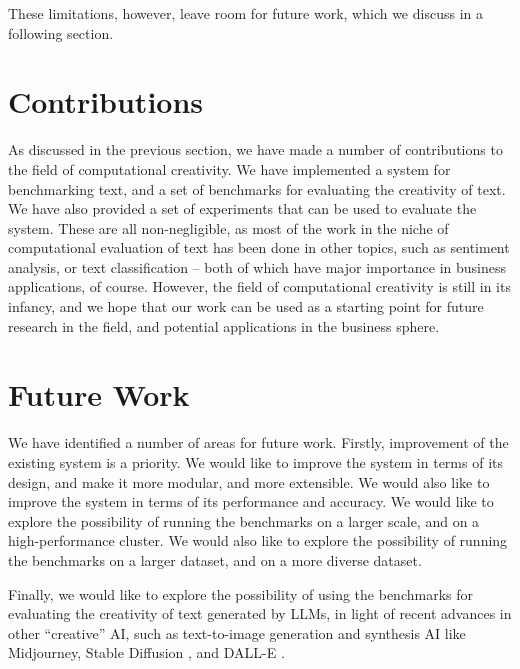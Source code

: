 These limitations, however, leave room for future work, which we discuss in a following section.

\section{Contributions}

As discussed in the previous section, we have made a number of contributions to the field of computational creativity. We have implemented a system for benchmarking text, and a set of benchmarks for evaluating the creativity of text. We have also provided a set of experiments that can be used to evaluate the system. These are all non-negligible, as most of the work in the niche of computational evaluation of text has been done in other topics, such as sentiment analysis, or text classification -- both of which have major importance in business applications, of course. However, the field of computational creativity is still in its infancy, and we hope that our work can be used as a starting point for future research in the field, and potential applications in the business sphere.

\section{Future Work}

We have identified a number of areas for future work. Firstly, improvement of the existing system is a priority. We would like to improve the system in terms of its design, and make it more modular, and more extensible. We would also like to improve the system in terms of its performance and accuracy. We would like to explore the possibility of running the benchmarks on a larger scale, and on a high-performance cluster. We would also like to explore the possibility of running the benchmarks on a larger dataset, and on a more diverse dataset. 


Finally, we would like to explore the possibility of using the benchmarks for evaluating the creativity of text generated by LLMs, in light of recent advances in other ``creative'' AI, such as text-to-image generation and synthesis AI like Midjourney, Stable Diffusion \citep{stable_diffusion_rombach2022highresolution}, and DALL-E \citep{dall-e_ramesh2021zeroshot}.